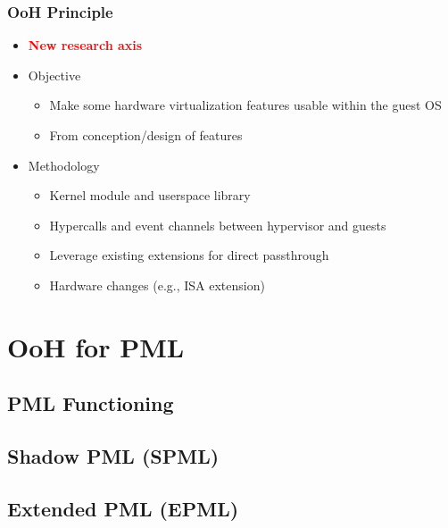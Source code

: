 \documentclass[xcolor=table,bigger,unknownkeysallowed]{beamer}
\newcommand{\myemph}[1]{\textcolor{red}{\bf #1}}
\begin{document}
\begin{frame}
	\frametitle{OoH Principle}
	\begin{itemize}
		\item \myemph{New research axis}
		\item Objective
		\begin{itemize}
			\item Make some hardware virtualization features usable within the guest OS
			\item From conception/design of features
		\end{itemize}
		\pause
		\item Methodology
		\begin{itemize}
			\item Kernel module and userspace library
			\item Hypercalls and event channels between hypervisor and guests
			\item Leverage existing extensions for direct passthrough
			\item Hardware changes (e.g., ISA extension)
		\end{itemize}		
	\end{itemize}
\end{frame}

\section{OoH for PML}
\subsection{PML Functioning}
\subsection{Shadow PML (SPML)}
\subsection{Extended PML (EPML)}
\end{document}
